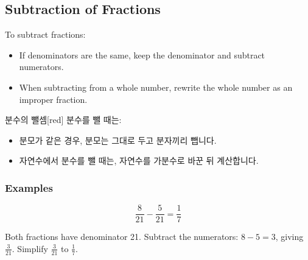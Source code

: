 \documentclass[12pt]{book}
\begin{document}
  
  
  \twosidedpaper
\subsection{Subtraction of Fractions}

To subtract fractions:  
\begin{itemize}
  \item If denominators are the same, keep the denominator and subtract numerators.  
  \item When subtracting from a whole number, rewrite the whole number as an improper fraction.  
\end{itemize}

\begin{flexbox}{분수의 뺄셈}[red]
분수를 뺄 때는:  
\begin{itemize}
  \item 분모가 같은 경우, 분모는 그대로 두고 분자끼리 뺍니다.  
  \item 자연수에서 분수를 뺄 때는, 자연수를 가분수로 바꾼 뒤 계산합니다.  
\end{itemize}
\end{flexbox}

\subsubsection*{Examples}

\[
\dfrac{8}{21} - \dfrac{5}{21} = \dfrac{1}{7}
\]

Both fractions have denominator 21.  
Subtract the numerators: $8-5=3$, giving $\tfrac{3}{21}$.  
Simplify $\tfrac{3}{21}$ to $\tfrac{1}{7}$.  

\end{document}
